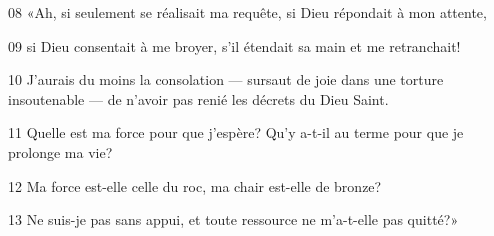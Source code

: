 
08 «Ah, si seulement se réalisait ma requête, si Dieu répondait à mon attente,

09 si Dieu consentait à me broyer, s’il étendait sa main et me retranchait!

10 J’aurais du moins la consolation --- sursaut de joie dans une torture insoutenable --- de n’avoir pas renié les décrets du Dieu Saint.

11 Quelle est ma force pour que j’espère? Qu’y a-t-il au terme pour que je prolonge ma vie?

12 Ma force est-elle celle du roc, ma chair est-elle de bronze?

13 Ne suis-je pas sans appui, et toute ressource ne m’a-t-elle pas quitté?»